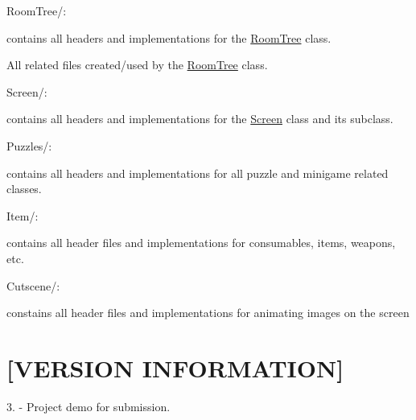 Room\-Tree/\-:
\begin{DoxyItemize}
\item contains all headers and implementations for the \hyperlink{classRoomTree}{Room\-Tree} class.
\item All related files created/used by the \hyperlink{classRoomTree}{Room\-Tree} class.
\end{DoxyItemize}

Screen/\-:
\begin{DoxyItemize}
\item contains all headers and implementations for the \hyperlink{classScreen}{Screen} class and its subclass.
\end{DoxyItemize}

Puzzles/\-:
\begin{DoxyItemize}
\item contains all headers and implementations for all puzzle and minigame related classes.
\end{DoxyItemize}

Item/\-:
\begin{DoxyItemize}
\item contains all header files and implementations for consumables, items, weapons, etc.
\end{DoxyItemize}

Cutscene/\-:
\begin{DoxyItemize}
\item constains all header files and implementations for animating images on the screen
\end{DoxyItemize}

\section*{\mbox{[}V\-E\-R\-S\-I\-O\-N I\-N\-F\-O\-R\-M\-A\-T\-I\-O\-N\mbox{]} }

3. -\/ Project demo for submission. 